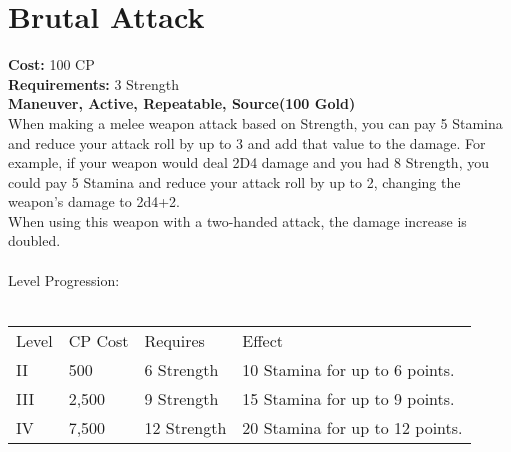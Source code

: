 \section{Brutal Attack}
\textbf{Cost:} 100 CP\\
\textbf{Requirements:} 3 Strength\\
\textbf{Maneuver, Active, Repeatable, Source(100 Gold)}\\
When making a melee weapon attack based on Strength, you can pay 5 Stamina and reduce your attack roll by up to 3 and add that value to the damage. For example, if your weapon would deal 2D4 damage and you had 8 Strength, you could pay 5 Stamina and reduce your attack roll by up to 2, changing the weapon's damage to 2d4+2.\\
When using this weapon with a two-handed attack, the damage increase is doubled.\\
\\
Level Progression:\\
\\
\begin{tabular}{l | l | l | l}
	Level & CP Cost & Requires & Effect\\
	II & 500 & 6 Strength & 10 Stamina for up to 6 points.\\
	III & 2,500 & 9 Strength & 15 Stamina for up to 9 points.\\
	IV & 7,500 & 12 Strength & 20 Stamina for up to 12 points.\\
\end{tabular}